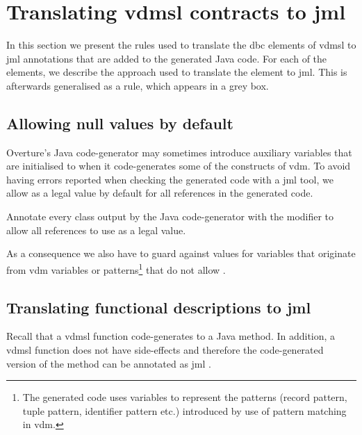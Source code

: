 \section{Translating \ac{vdmsl} contracts to \ac{jml}}
\label{sec:sl-dbc-gen}

In this section we present the rules used to translate the \ac{dbc}
elements of \ac{vdmsl} to \ac{jml} annotations that are added to the
generated Java code. For each of the elements, we describe the
approach used to translate the element to \ac{jml}. This is afterwards
generalised as a rule, which appears in a grey box.

\subsection{Allowing null values by default}
\label{sec:modules}

Overture's Java code-generator may sometimes introduce auxiliary
variables that are initialised to  when it code-generates
some of the constructs of \ac{vdm}. To avoid having errors reported
when checking the generated code with a \ac{jml} tool, we allow
 as a legal value by default for all references in the
generated code.

 {Annotate every class output by the
  Java code-generator with the  modifier to
  allow all references to use  as a legal value.}
%
%

As a consequence we also have to guard against  values for
variables that originate from \ac{vdm} variables or
patterns\footnote{The generated code uses variables to represent the
  patterns (record pattern, tuple pattern, identifier pattern etc.)
  introduced by use of pattern matching in \ac{vdm}.}  that do not
allow .

\subsection{Translating functional descriptions to \ac{jml}}
\label{sec:func-desc}

Recall that a \ac{vdmsl} function code-generates to a  Java
method. In addition, a \ac{vdmsl} function does not have side-effects
and therefore the code-generated version of the method can be
annotated as \ac{jml} .

%
%

